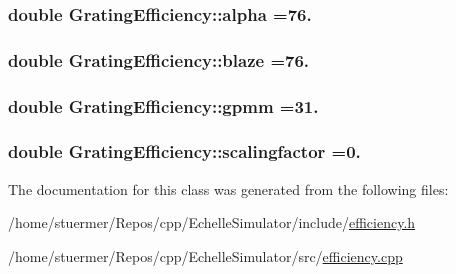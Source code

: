 \subsubsection[{\texorpdfstring{alpha}{alpha}}]{\setlength{\rightskip}{0pt plus 5cm}double Grating\+Efficiency\+::alpha =76.\hspace{0.3cm}{\ttfamily [private]}}\hypertarget{class_grating_efficiency_abb5fb732555147e8f977487d3a234c51}{}\label{class_grating_efficiency_abb5fb732555147e8f977487d3a234c51}
\subsubsection[{\texorpdfstring{blaze}{blaze}}]{\setlength{\rightskip}{0pt plus 5cm}double Grating\+Efficiency\+::blaze =76.\hspace{0.3cm}{\ttfamily [private]}}\hypertarget{class_grating_efficiency_a541aa917f023bbb38025c271e3060d31}{}\label{class_grating_efficiency_a541aa917f023bbb38025c271e3060d31}
\subsubsection[{\texorpdfstring{gpmm}{gpmm}}]{\setlength{\rightskip}{0pt plus 5cm}double Grating\+Efficiency\+::gpmm =31.\hspace{0.3cm}{\ttfamily [private]}}\hypertarget{class_grating_efficiency_a3bbe348499e4b3d6792a2f8ecaca1f94}{}\label{class_grating_efficiency_a3bbe348499e4b3d6792a2f8ecaca1f94}
\subsubsection[{\texorpdfstring{scalingfactor}{scalingfactor}}]{\setlength{\rightskip}{0pt plus 5cm}double Grating\+Efficiency\+::scalingfactor =0.\hspace{0.3cm}{\ttfamily [private]}}\hypertarget{class_grating_efficiency_af452d057f148d401e9f2072e3752e0a4}{}\label{class_grating_efficiency_af452d057f148d401e9f2072e3752e0a4}


The documentation for this class was generated from the following files\+:\begin{DoxyCompactItemize}
\item 
/home/stuermer/\+Repos/cpp/\+Echelle\+Simulator/include/\hyperlink{efficiency_8h}{efficiency.\+h}\item 
/home/stuermer/\+Repos/cpp/\+Echelle\+Simulator/src/\hyperlink{efficiency_8cpp}{efficiency.\+cpp}\end{DoxyCompactItemize}
